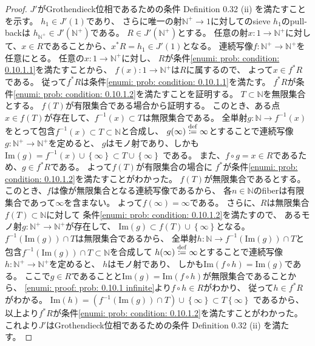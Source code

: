 \documentclass[uplatex]{jsarticle}
\theoremstyle{definition}
\newcommand{\im}{\mathrm{Im}}
\def\N{\mathbb{N}}
\newcommand{\dfn}{\overset{\mathrm{\tiny def}}{\coloneqq}}
\begin{document}
\begin{proof}
  \(J'\)がGrothendieck位相であるための条件 Definition 0.32 (ii) を満たすことを示す。
  \(h_1\in J'(1)\)であり、
  さらに唯一の射\(\N^+\to 1\)に対してのsieve \(h_1\)のpull-backは
  \(h_{\N^+}\in J'(\N^+)\)である。
  \(R\in J'(\N^+)\)とする。
  任意の射\(x:1\to \N^+\)に対して、\(x\in R\)であることから、\(x^*R = h_1\in J'(1)\)となる。
  連続写像\(f:\N^+\to \N^+\)を任意にとる。
  任意の\(x:1\to \N^+\)に対し、
  \(R\)が条件\ref{enumi: prob: condition: 0.10.1.1}を満たすことから、
  \(f(x):1\to \N^+\)は\(R\)に属するので、
  よって\(x\in f^*R\)である。
  従って\(f^*R\)は条件\ref{enumi: prob: condition: 0.10.1.1}を満たす。
  \(f^*R\)が条件\ref{enumi: prob: condition: 0.10.1.2}を満たすことを証明する。
  \(T\subset \N\)を無限集合とする。
  \(f(T)\)が有限集合である場合から証明する。
  このとき、ある点\(x\in f(T)\)が存在して、\(f^{-1}(x)\subset T\)は無限集合である。
  全単射\(g:\N\to f^{-1}(x)\)をとって包含\(f^{-1}(x)\subset T\subset \N\)と合成し、
  \(g(\infty) \dfn \infty\)とすることで連続写像\(g:\N^+\to \N^+\)を定めると、
  \(g\)はモノ射であり、しかも
  \(\im(g) = f^{-1}(x)\cup\left\{\infty\right\} \subset T\cup\left\{\infty\right\}\)
  である。
  また、\(f\circ g = x\in R\)であるため、\(g\in f^*R\)である。
  よって\(f(T)\)が有限集合の場合に
  \(f^*\)が条件\ref{enumi: prob: condition: 0.10.1.2}を満たすことがわかった。
  \(f(T)\)が無限集合であるとする。
  このとき、\(f\)は像が無限集合となる連続写像であるから、
  各\(n\in \N\)のfiberは有限集合であって\(\infty\)を含まない。
  よって\(f(\infty) = \infty\)である。
  さらに、\(R\)は無限集合\(f(T) \subset \N\)に対して
  条件\ref{enumi: prob: condition: 0.10.1.2}を満たすので、
  あるモノ射\(g:\N^+\to \N^+\)が存在して、
  \(\im(g)\subset f(T)\cup\left\{\infty\right\}\)となる。
  \(f^{-1}(\im(g))\cap T\)は無限集合であるから、
  全単射\(h:\N\to f^{-1}(\im(g))\cap T\)と包含\(f^{-1}(\im(g))\cap T\subset \N\)を合成して
  \(h(\infty) \dfn \infty\)とすることで連続写像\(h:\N^+\to \N^+\)を定めると、
  \(h\)はモノ射であり、
  しかも\(\im(f\circ h) = \im(g)\)である。
  ここで\(g\in R\)であることと\(\im(g)=\im(f\circ h)\)が無限集合であることから、
  \ref{enumi: proof: prob: 0.10.1 infinite}より\(f\circ h\in R\)がわかり、
  従って\(h\in f^*R\)がわかる。
  \(\im(h) = (f^{-1}(\im(g))\cap T)\cup\left\{\infty\right\} \subset T\left\{\infty\right\}\)
  であるから、以上より\(f^*R\)が条件\ref{enumi: prob: condition: 0.10.1.2}を満たすことがわかった。
  これより\(J'\)はGrothendieck位相であるための条件 Definition 0.32 (ii) を満たす。


\end{proof}
\end{document}

